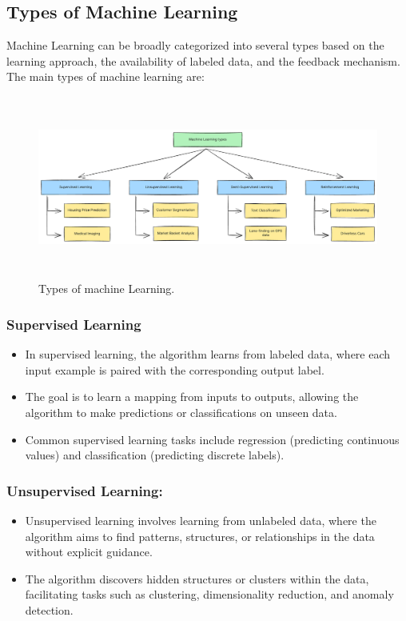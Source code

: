 \subsection{Types of Machine Learning}

Machine Learning can be broadly categorized into several types based on the learning approach, the availability of labeled data, and the feedback mechanism. The main types of machine learning are:

\begin{figure}[htpb]
    \centering
    \includegraphics[width=\textwidth,height=6cm,keepaspectratio=true]{ml-types.pdf}
    \caption{
        Types of machine Learning.
    }
\end{figure}

\subsubsection*{Supervised Learning}

\begin{itemize}
    \item{In supervised learning, the algorithm learns from labeled data, where each input example is paired with the corresponding output label.}
    \item{The goal is to learn a mapping from inputs to outputs, allowing the algorithm to make predictions or classifications on unseen data.}
    \item{Common supervised learning tasks include regression (predicting continuous values) and classification (predicting discrete labels).}
\end{itemize}

\subsubsection*{Unsupervised Learning:}

\begin{itemize}
    \item{Unsupervised learning involves learning from unlabeled data, where the algorithm aims to find patterns, structures, or relationships in the data without explicit guidance.}
    \item{The algorithm discovers hidden structures or clusters within the data, facilitating tasks such as clustering, dimensionality reduction, and anomaly detection.}
\end{itemize}

